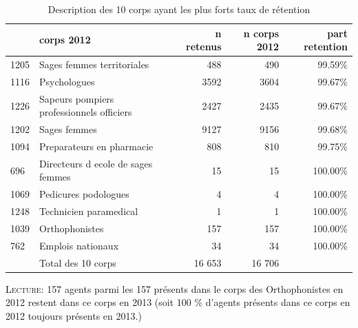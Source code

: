 \documentclass[11pt,a4paper]{article}
\begin{document}
\begin{table}[h!]
	\label{means}
	\centering
	\caption{Description des 10 corps ayant les plus forts taux de rétention} 
\begin{tabular}{llrrr}
	\toprule
	{} &                         corps 2012 &  n retenus &  n corps 2012 &  part retention \\
	\midrule
	1205 &                         Sages femmes territoriales &              488 &                                          490 &                                             99.59\% \\
	1116 &                                       Psychologues &             3592 &                                         3604 &                                             99.67\% \\
	1226 &          Sapeurs pompiers professionnels officiers &             2427 &                                         2435 &                                             99.67\% \\
	1202 &                                       Sages femmes &             9127 &                                         9156 &                                             99.68\% \\
	1094 &                          Preparateurs en pharmacie &              808 &                                          810 &                                             99.75\% \\
	696  &                 Directeurs d ecole de sages femmes &               15 &                                           15 &                                            100.00\% \\
	1069 &                               Pedicures podologues &                4 &                                            4 &                                            100.00\% \\
	1248 &                             Technicien paramedical &                1 &                                            1 &                                            100.00\% \\
	1039 &                                     Orthophonistes &              157 &                                          157 &                                            100.00\% \\
	762  &                                  Emplois nationaux &               34 &                                           34 &                                            100.00\% \\
	     & Total des 10 corps & 16 653 & 16 706\\
	\bottomrule
\end{tabular}
\begin{minipage}{15cm}
	\footnotesize
	\textsc{Lecture:} 157 agents parmi les 157 présents dans le corps des Orthophonistes en 2012 restent dans ce corps en 2013 (soit 100 \% d'agents présents dans ce corps en 2012 toujours présents en 2013.)
\end{minipage}
\end{table}
\end{document}
